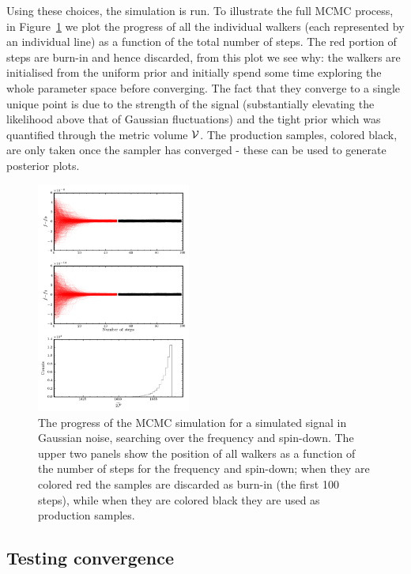 \documentclass[aps, prd, twocolumn, superscriptaddress, floatfix, showpacs, nofootinbib, longbibliography]{revtex4-1}
\begin{document}
Using these choices, the simulation is run. To illustrate the full MCMC
process, in Figure~\ref{fig_MCMC_simple_example} we plot the progress of all
the individual walkers (each represented by an individual line) as a function
of the total number of steps. The red portion of steps are burn-in and hence
discarded, from this plot we see why: the walkers are initialised from the
uniform prior and initially spend some time exploring the whole parameter space
before converging. The fact that they converge to a single unique point is due
to the strength of the signal (substantially elevating the likelihood above
that of Gaussian fluctuations) and the tight prior which was quantified through the
metric volume $\mathcal{V}$. The production samples, colored black, are only taken once
the sampler has converged - these can be used to generate posterior plots.
\begin{figure}[htb]
\centering
\includegraphics[width=0.45\textwidth]{fully_coherent_search_using_MCMC_walkers}
\caption{The progress of the MCMC simulation for a simulated signal in Gaussian
noise, searching over the frequency and spin-down. The upper two panels show
the position of all walkers as a function of the number of steps for the
frequency and spin-down; when they are colored red the samples are discarded as
burn-in (the first 100 steps), while when they are colored black they are used
as production samples.}
\label{fig_MCMC_simple_example}
\end{figure}

\subsection{Testing convergence}
\end{document}

